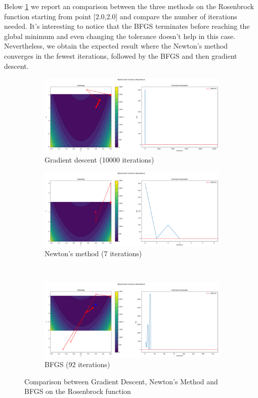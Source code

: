 Below \ref{fig:ros-comparison} we report an comparison between the three methods on the Rosenbrock function starting from point [2.0,2.0] and compare the number of iterations needed. It's interesting to notice that the BFGS terminates before reaching the global minimum and even changing the tolerance doesn't help in this case. Nevertheless, we obtain the expected result where the Newton's method converges in the fewest iterations, followed by the BFGS and then gradient descent.
\begin{figure}
    \begin{subfigure}{0.5\linewidth}
        \includegraphics[width=\linewidth]{lab3/imgs/gd_rosenbrock.png}
        \caption{Gradient descent (10000 iterations)}
    \end{subfigure}
    \begin{subfigure}{0.5\linewidth}
        \includegraphics[width=\linewidth]{lab3/imgs/nm_rosenbrock.png}
        \caption{Newton's method (7 iterations)}
    \end{subfigure} \\
    \begin{subfigure}{\linewidth}
        \centering
        \includegraphics[width=0.5\linewidth]{lab3/imgs/bfgs_rosenbrock.png}
        \caption{BFGS (92 iterations)}
    \end{subfigure}
    \caption{Comparison between Gradient Descent, Newton's Method and BFGS on the Rosenbrock function}
    \label{fig:ros-comparison}
\end{figure}